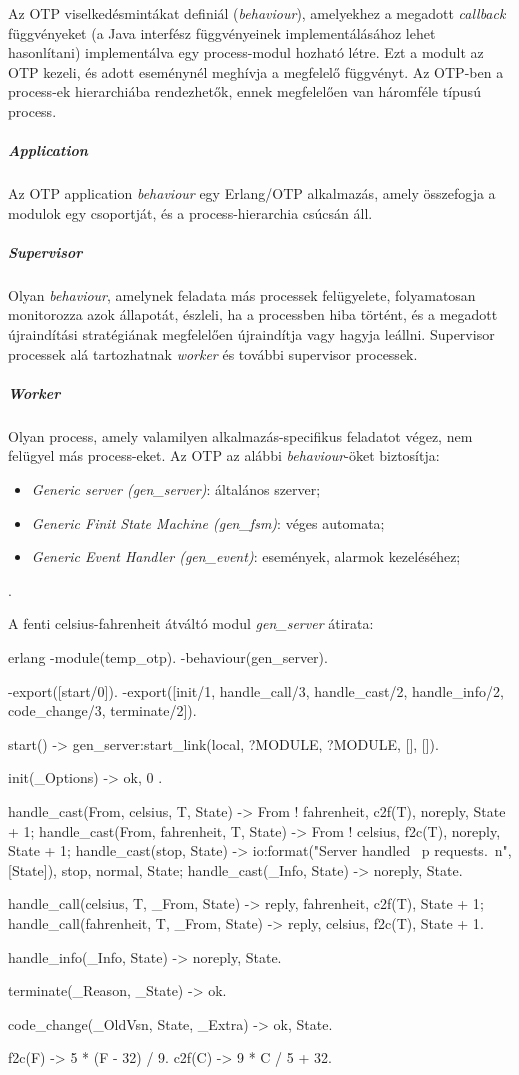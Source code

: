 \documentclass[12pt, a4paper, oneside]{book}
\begin{document}
Az OTP viselkedésmintákat definiál (\emph{behaviour}), amelyekhez a megadott
\emph{callback} függvényeket (a Java interfész függvényeinek implementálásához
lehet hasonlítani) implementálva egy process-modul hozható létre. Ezt a modult
az OTP kezeli, és adott eseménynél meghívja a megfelelő függvényt. Az OTP-ben a
process-ek hierarchiába rendezhetők, ennek megfelelően van háromféle típusú
process.

\subparagraph{Application} Az OTP application \emph{behaviour} egy Erlang/OTP
alkalmazás, amely összefogja a modulok egy csoportját, és a process-hierarchia
csúcsán áll.

\subparagraph{Supervisor} Olyan \emph{behaviour}, amelynek feladata más processek
felügyelete, folyamatosan monitorozza azok állapotát, észleli, ha
a processben hiba történt, és a megadott újraindítási stratégiának megfelelően
újraindítja vagy hagyja leállni. Supervisor processek alá tartozhatnak
\emph{worker} és további supervisor processek.

\subparagraph{Worker} Olyan process, amely valamilyen alkalmazás-specifikus
feladatot végez, nem felügyel más process-eket. Az OTP az alábbi
\emph{behaviour}-öket biztosítja:
\begin{itemize}
\item \emph{Generic server (gen\_server)}: általános szerver;
\item \emph{Generic Finit State Machine (gen\_fsm)}: véges automata;
\item \emph{Generic Event Handler (gen\_event)}: események, alarmok kezeléséhez;
\end{itemize}

\citep{OTPInAction}.

\newpage
A fenti celsius-fahrenheit átváltó modul \emph{gen\_server} átirata:

\begin{code}{erlang}{}
-module(temp_otp).
-behaviour(gen_server).

-export([start/0]).
-export([init/1, handle_call/3, handle_cast/2, 
         handle_info/2, code_change/3, terminate/2]).

start() ->
  gen_server:start_link({local, ?MODULE}, ?MODULE, [], []).

init(_Options) ->
  {ok, 0 }.

handle_cast({From, celsius, T}, State) ->
  From ! {fahrenheit, c2f(T)},
  {noreply, State + 1};
handle_cast({From, fahrenheit, T}, State) ->
  From ! {celsius, f2c(T)},
  {noreply, State + 1};
handle_cast(stop, State) ->
  io:format("Server handled ~p requests.~n", [State]),
  {stop, normal, State};
handle_cast(_Info, State) ->
  {noreply, State}.

handle_call({celsius, T}, _From, State) ->
  {reply, {fahrenheit, c2f(T)}, State + 1};
handle_call({fahrenheit, T}, _From, State) ->
  {reply, {celsius, f2c(T)}, State + 1}.

handle_info(_Info, State) ->
  {noreply, State}.

terminate(_Reason, _State) ->
  ok.

code_change(_OldVsn, State, _Extra) ->
  {ok, State}.

f2c(F) ->
  5 * (F - 32) / 9.
c2f(C) ->
  9 * C / 5 + 32.
\end{code}
\end{document}
